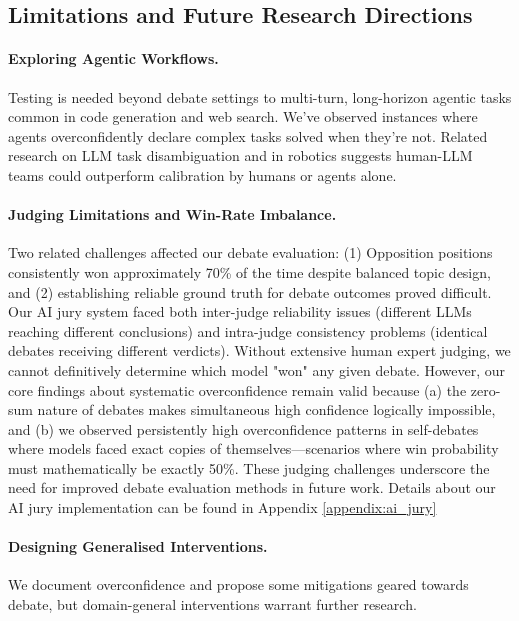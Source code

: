 \documentclass{article}
\begin{document}
\subsection{Limitations and Future Research Directions}
\label{subsec:limitations_future}

\paragraph{Exploring Agentic Workflows.} Testing is needed beyond debate settings to multi-turn, long-horizon agentic tasks common in code generation and web search. We've observed instances where agents overconfidently declare complex tasks solved when they're not. Related research on LLM task disambiguation \citep{hu2024uncertaintythoughtsuncertaintyawareplanning,kobalczyk2025activetaskdisambiguationllms} and in robotics \citep{liang2025introspectiveplanningaligningrobots,ren2023robotsaskhelpuncertainty} suggests human-LLM teams could outperform calibration by humans or agents alone.

\paragraph{Judging Limitations and Win-Rate Imbalance.} Two related challenges affected our debate evaluation: (1) Opposition positions consistently won approximately 70\% of the time despite balanced topic design, and (2) establishing reliable ground truth for debate outcomes proved difficult. Our AI jury system faced both inter-judge reliability issues (different LLMs reaching different conclusions) and intra-judge consistency problems (identical debates receiving different verdicts). Without extensive human expert judging, we cannot definitively determine which model "won" any given debate. However, our core findings about systematic overconfidence remain valid because (a) the zero-sum nature of debates makes simultaneous high confidence logically impossible, and (b) we observed persistently high overconfidence patterns in self-debates where models faced exact copies of themselves—scenarios where win probability must mathematically be exactly 50\%. These judging challenges underscore the need for improved debate evaluation methods in future work. Details about our AI jury implementation can be found in Appendix \ref{appendix:ai_jury}

\paragraph{Designing Generalised Interventions.} We document overconfidence and propose some mitigations geared towards debate, but domain-general interventions warrant further research.
\end{document}
